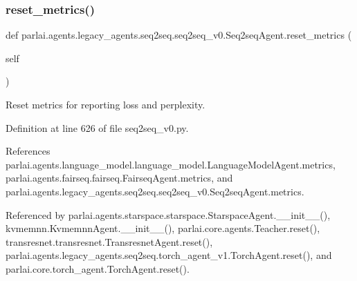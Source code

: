 \subsubsection{\texorpdfstring{reset\+\_\+metrics()}{reset\_metrics()}}
{\footnotesize\ttfamily def parlai.\+agents.\+legacy\+\_\+agents.\+seq2seq.\+seq2seq\+\_\+v0.\+Seq2seq\+Agent.\+reset\+\_\+metrics (\begin{DoxyParamCaption}\item[{}]{self }\end{DoxyParamCaption})}

\begin{DoxyVerb}Reset metrics for reporting loss and perplexity.\end{DoxyVerb}
 

Definition at line 626 of file seq2seq\+\_\+v0.\+py.



References parlai.\+agents.\+language\+\_\+model.\+language\+\_\+model.\+Language\+Model\+Agent.\+metrics, parlai.\+agents.\+fairseq.\+fairseq.\+Fairseq\+Agent.\+metrics, and parlai.\+agents.\+legacy\+\_\+agents.\+seq2seq.\+seq2seq\+\_\+v0.\+Seq2seq\+Agent.\+metrics.



Referenced by parlai.\+agents.\+starspace.\+starspace.\+Starspace\+Agent.\+\_\+\+\_\+init\+\_\+\+\_\+(), kvmemnn.\+Kvmemnn\+Agent.\+\_\+\+\_\+init\+\_\+\+\_\+(), parlai.\+core.\+agents.\+Teacher.\+reset(), transresnet.\+transresnet.\+Transresnet\+Agent.\+reset(), parlai.\+agents.\+legacy\+\_\+agents.\+seq2seq.\+torch\+\_\+agent\+\_\+v1.\+Torch\+Agent.\+reset(), and parlai.\+core.\+torch\+\_\+agent.\+Torch\+Agent.\+reset().

